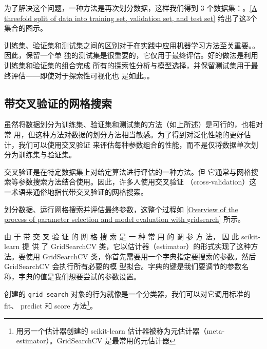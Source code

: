 为了解决这个问题，一种方法是再次划分数据，这样我们得到 3 个数据集：。\autoref{A threefold split of data into training set, validation set, and test set} 给出了这3个集合的图示。


训练集、验证集和测试集之间的区别对于在实践中应用机器学习方法至关重要。。因此，保留一个单
独的测试集是很重要的，它仅用于最终评估。好的做法是利用训练集和验证集的组合完成
所有的探索性分析与模型选择，并保留测试集用于最终评估——即使对于探索性可视化也
是如此。。
\subsection{带交叉验证的网格搜索}
虽然将数据划分为训练集、验证集和测试集的方法（如上所述）是可行的，也相对常
用，但这种方法对数据的划分方法相当敏感。为了得到对泛化性能的更好估计，我们可以使用交叉验证
来评估每种参数组合的性能，而不是仅将数据单次划分为训练集与验证集。


\begin{tcolorbox}
    交叉验证是在特定数据集上对给定算法进行评估的一种方法。但
    它通常与网格搜索等参数搜索方法结合使用。因此，许多人使用交叉验证
    （cross-validation）这一术语来通俗地指代带交叉验证的网格搜索。
\end{tcolorbox}

划分数据、运行网格搜索并评估最终参数，这整个过程如 \autoref{Overview of the process of parameter selection and model evaluation with gridsearch} 所示。

由 于 带 交 叉 验 证 的 网 格 搜 索 是 一 种 常 用 的 调 参 方 法， 因 此 scikit-learn 提 供 了 GridSearchCV 类，它以估计器（estimator）的形式实现了这种方法。要使用 GridSearchCV
类，你首先需要用一个字典指定要搜索的参数。然后 GridSearchCV 会执行所有必要的模
型拟合。字典的键是我们要调节的参数名称，字典的值是我们想要尝试的参数设置。

创建的 \verb|grid_search| 对象的行为就像是一个分类器，我们可以对它调用标准的 fit、
predict 和 score 方法\footnote{用另一个估计器创建的 scikit-learn 估计器被称为元估计器（meta-estimator）。GridSearchCV 是最常用的元估计器}。

